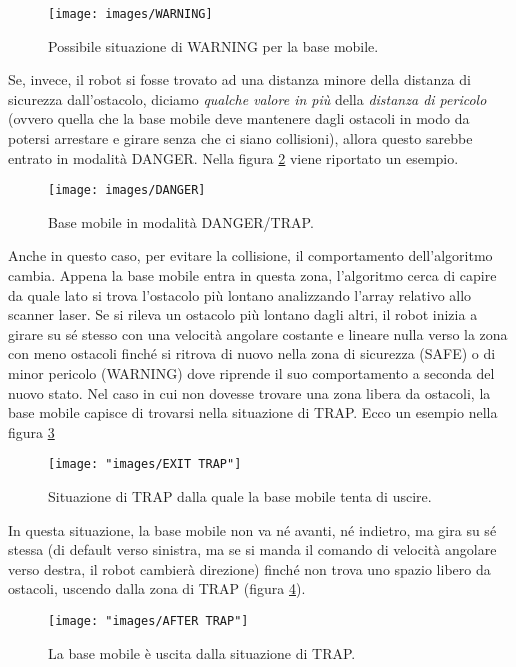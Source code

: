 \begin{figure}[h]
	\centering
	\texttt{[image: images/WARNING]}
	\caption{Possibile situazione di WARNING per la base mobile.}
	\label{fig:warning}
\end{figure}

Se, invece, il robot si fosse trovato ad una distanza minore della distanza di sicurezza dall'ostacolo, diciamo \textit{qualche valore in più} della \textit{distanza di pericolo} (ovvero quella che la base mobile deve mantenere dagli ostacoli in modo da potersi arrestare e girare senza che ci siano collisioni), allora questo sarebbe entrato in modalità DANGER. Nella figura \ref{fig:danger} viene riportato un esempio.

\begin{figure}[h]
	\centering
	\texttt{[image: images/DANGER]}
	\caption{Base mobile in modalità DANGER/TRAP.}
	\label{fig:danger}
\end{figure}

Anche in questo caso, per evitare la collisione, il comportamento dell’algoritmo cambia. Appena la base mobile entra in questa zona, l’algoritmo cerca di capire da quale lato si trova l’ostacolo più lontano analizzando l’array relativo allo scanner laser. Se si rileva un ostacolo più lontano dagli altri, il robot inizia a girare su sé stesso con una velocità angolare costante e lineare nulla verso la zona con meno ostacoli finché si ritrova di nuovo nella zona di sicurezza (SAFE) o di minor pericolo (WARNING) dove riprende il suo comportamento a seconda del nuovo stato. Nel caso in cui non dovesse trovare una zona libera da ostacoli, la base mobile capisce di trovarsi nella situazione di TRAP. Ecco un esempio nella figura \ref{fig:exit-trap}

\begin{figure}[h]
	\centering
	\texttt{[image: "images/EXIT TRAP"]}
	\caption{Situazione di TRAP dalla quale la base mobile tenta di uscire.}
	\label{fig:exit-trap}
\end{figure}

In questa situazione, la base mobile non va né avanti, né indietro, ma gira su sé stessa (di default verso sinistra, ma se si manda il comando di velocità angolare verso destra, il robot cambierà direzione) finché non trova uno spazio libero da ostacoli, uscendo dalla zona di TRAP (figura \ref{fig:after-trap}). \begin{figure}[h]
	\centering
	\texttt{[image: "images/AFTER TRAP"]}
	\caption{La base mobile è uscita dalla situazione di TRAP.}
	\label{fig:after-trap}
\end{figure}



